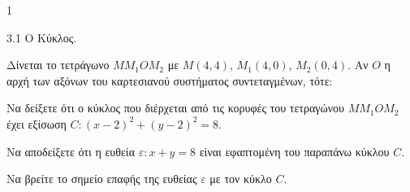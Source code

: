 \begin{ylh}{1}
    \item 3.1 Ο Κύκλος.
\end{ylh}
Δίνεται το τετράγωνο $MM_1OM_2$ με $M(4,4)$, $M_1(4,0)$, $M_2(0,4)$. Αν $O$ η αρχή των αξόνων του καρτεσιανού συστήματος συντεταγμένων, τότε:
\begin{alist}
\item Να δείξετε ότι ο κύκλος που διέρχεται από τις κορυφές του τετραγώνου $MM_1OM_2$ έχει εξίσωση $C: (x - 2)^2 + (y - 2)^2 = 8$. 
\item Να αποδείξετε ότι η ευθεία $\varepsilon: x + y = 8$ είναι εφαπτομένη του παραπάνω κύκλου $C$. 
\item Να βρείτε το σημείο επαφής της ευθείας $\varepsilon$ με τον κύκλο $C$. 
\end{alist}